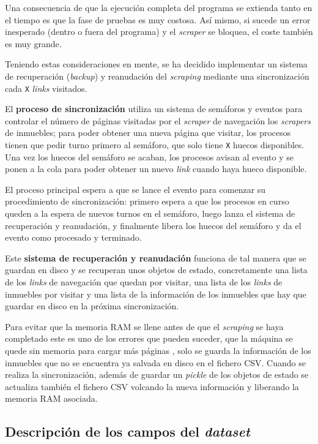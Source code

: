 \documentclass[12pt]{article}
\begin{document}
Una consecuencia de que la ejecución completa del programa se extienda tanto en el tiempo es que la fase de pruebas es muy costosa. Así mismo, si sucede un error inesperado (dentro o fuera del programa) y el \textit{scraper} se bloquea, el coste también es muy grande.

Teniendo estas consideraciones en mente, se ha decidido implementar un sistema de recuperación (\textit{backup}) y reanudación del \textit{scraping} mediante una sincronización cada \verb|X| \textit{links} visitados.

El \textbf{proceso de sincronización} utiliza un sistema de semáforos y eventos para controlar el número de páginas visitadas por el \textit{scraper} de navegación los \textit{scrapers} de inmuebles; para poder obtener una nueva página que visitar, los procesos tienen que pedir turno primero al semáforo, que solo tiene \verb|X| huecos disponibles. Una vez los huecos del semáforo se acaban, los procesos avisan al evento y se ponen a la cola para poder obtener un nuevo \textit{link} cuando haya hueco disponible.

El proceso principal espera a que se lance el evento para comenzar su procedimiento de sincronización: primero espera a que los procesos en curso queden a la espera de nuevos turnos en el semáforo, luego lanza el sistema de recuperación y reanudación, y finalmente libera los huecos del semáforo y da el evento como procesado y terminado.

Este \textbf{sistema de recuperación y reanudación} funciona de tal manera que se guardan en disco y se recuperan unos objetos de estado, concretamente una lista de los \textit{links} de navegación que quedan por visitar, una lista de los \textit{links} de inmuebles por visitar y una lista de la información de los inmuebles que hay que guardar en disco en la próxima sincronización.

Para evitar que la memoria RAM se llene antes de que el \textit{scraping} se haya completado \textemdash este es uno de los errores que pueden suceder, que la máquina se quede sin memoria para cargar más páginas \textemdash, solo se guarda la información de los inmuebles que no se encuentra ya salvada en disco en el fichero CSV. Cuando se realiza la sincronización, además de guardar un \textit{pickle} de los objetos de estado se actualiza también el fichero CSV volcando la nueva información y liberando la memoria RAM asociada.

\vspace{-1.5em}\subsection*{Descripción de los campos del \textit{dataset}}\vspace{-1em}
\end{document}
